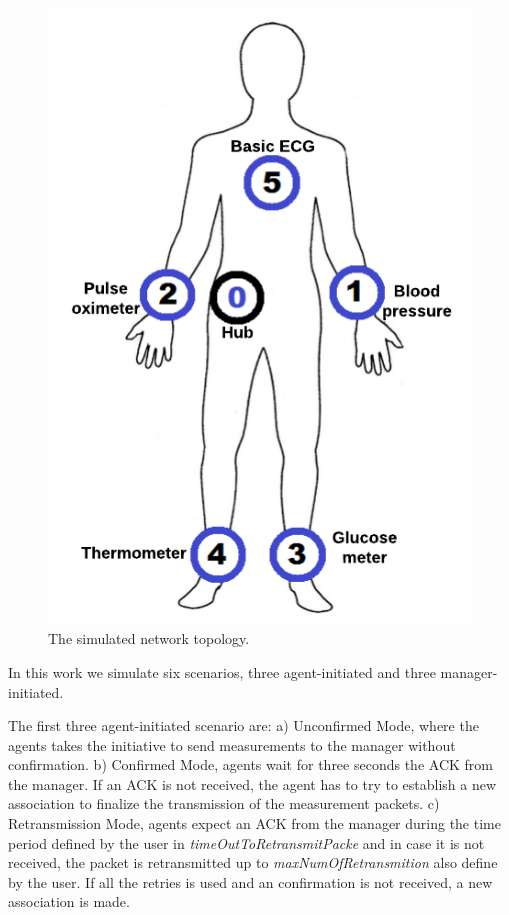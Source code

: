 \begin{figure}[htbp]
\centerline{\includegraphics[scale=0.29]{figures/corpoSensoresNomes.png}}
\caption{The simulated network topology.}
\label{fig:wbantopology}
\end{figure}

In this work we simulate six scenarios, three agent-initiated and three manager-initiated.

The first three agent-initiated scenario are: a) Unconfirmed Mode, where the agents takes the initiative to send measurements to the manager without confirmation. b) Confirmed Mode, agents wait for three seconds the ACK from the manager. If an ACK is not received, the agent has to try to establish a new association to finalize the transmission of the measurement packets. c) Retransmission Mode, agents expect an ACK from the manager during the time period defined by the user in \textit{timeOutToRetransmitPacke} and in case it is not received, the packet is retransmitted up to \textit{maxNumOfRetransmition} also define by the user. If all the retries is used and an confirmation is not received, a new association is made. 

